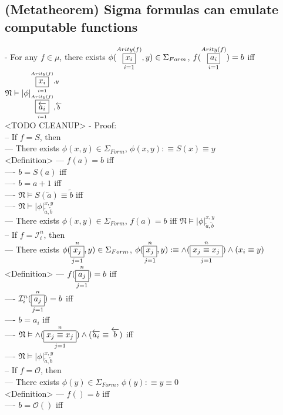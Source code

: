 \documentclass{book}
\newcommand{\is}{:\equiv}
\newcommand{\vdc}[3]{\underset{#2}{\overset{#3}{\fbox{$#1$}}}}
\newcommand{\sub}[3]{\left|#1\right|_{#3}^{#2}}
\begin{document}
\subsection{(Metatheorem) Sigma formulas can emulate computable functions} %
	- For any $f \in \mu$, there exists $\phi(\vdc{x_i}{i=1}{Arity(f)}, y) \in \Sigma_{Form}$, $f(\vdc{a_i}{i=1}{Arity(f)}) = b$ iff $\mathfrak{N} \vDash \sub{\phi}{\vdc{x_i}{i=1}{Arity(f)}, y}{\vdc{\overleftarrow{a_i}}{i=1}{Arity(f)}, \overleftarrow{b}}$ \\ <TODO CLEANUP>
	- Proof: \\
		-- If $f = S$, then \\
			--- There exists $\phi(x, y) \in \Sigma_{Form}$, $\phi(x, y) \is S(x) \equiv y$ \\ <Definition>
			--- $f(a) = b$ iff \\
				---- $b = S(a)$ iff \\
				---- $b = a + 1$ iff \\
				---- $\mathfrak{N} \vDash S(\overleftarrow{a}) \equiv \overleftarrow{b}$ iff \\
				---- $\mathfrak{N} \vDash \sub{\phi}{x, y}{\overleftarrow{a}, \overleftarrow{b}}$ \\
			--- There exists $\phi(x, y) \in \Sigma_{Form}$, $f(a) = b$ iff $\mathfrak{N} \vDash \sub{\phi}{x, y}{\overleftarrow{a}, \overleftarrow{b}}$ \\
		-- If $f = \mathcal{I}_i^n$, then \\
			--- There exists $\phi(\vdc{x_j}{j=1}{n}, y) \in \Sigma_{Form}$, $\phi(\vdc{x_j}{j=1}{n}, y) \is \land(\vdc{x_j \equiv x_j}{j=1}{n}) \land (x_i \equiv y)$ \\ <Definition>
			--- $f(\vdc{a_j}{j=1}{n}) = b$ iff \\
				---- $\mathcal{I}_i^n(\vdc{a_j}{j=1}{n}) = b$ iff \\
				---- $b = a_i$ iff \\
				---- $\mathfrak{N} \vDash \land(\vdc{x_j \equiv x_j}{j=1}{n}) \land (\overleftarrow{a_i} \equiv \overleftarrow{b})$ iff \\
				---- $\mathfrak{N} \vDash \sub{\phi}{x, y}{\overleftarrow{a}, \overleftarrow{b}}$ \\
		-- If $f = \mathcal{O}$, then \\
			--- There exists $\phi(y) \in \Sigma_{Form}$, $\phi(y) \is y \equiv 0$ \\ <Definition>
			--- $f() = b$ iff \\
				---- $b = \mathcal{O}()$ iff \\
\end{document}

